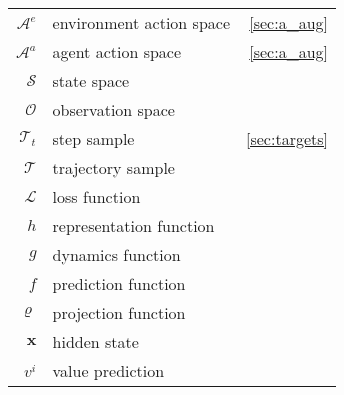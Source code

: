 \begin{tabular}{| r  l  r |}
    $\mathcal{A}^e$ & environment action space               & \ref{sec:a_aug}                          \\
    $\mathcal{A}^a$ & agent action space                     & \ref{sec:a_aug}                          \\
    $\mathcal{S}$   & state space                                                                       \\
    $\mathcal{O}$   & observation space                                                                 \\
    $\mathcal{T}_t$ & step sample                            & \ref{sec:targets}                        \\
    $\mathcal{T}$   & trajectory sample                                                                 \\
    $\mathcal{L}$   & loss function                                                                     \\

    \hline
    $h$             & representation function                                                           \\
    $g$             & dynamics function                                                                 \\
    $f$             & prediction function                                                               \\
    $\varrho$       & projection function                                                               \\
    $\mathbf{x}$    & hidden state                                                                      \\
    $v^i$           & value prediction                                                                  \\


\end{tabular}
